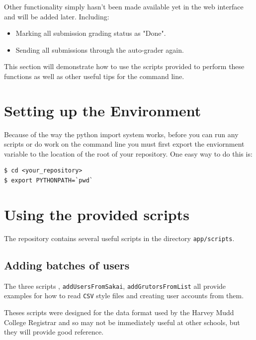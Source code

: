 \documentclass[11pt]{report}
\begin{document}
Other functionality simply hasn't been made available yet
in the web interface and will be added later. Including:
\begin{itemize}
  \item Marking all submission grading status as "Done".
  \item Sending all submissions through the auto-grader again.
\end{itemize}

This section will demonstrate how to use the scripts provided to perform these
functions as well as other useful tips for the command line.

\section{Setting up the Environment}
Because of the way the python import system works, before you can run any
scripts or do work on the command line you must first export the enviornment
variable  to the location of the root of your repository.
One easy way to do this is:
\begin{verbatim}
$ cd <your_repository>
$ export PYTHONPATH=`pwd`
\end{verbatim}

\section{Using the provided scripts}
The repository contains several useful scripts in the directory
\texttt{app/scripts}.

\subsection{Adding batches of users}
The three scripts , \texttt{addUsersFromSakai},
\texttt{addGrutorsFromList} all provide examples for how to read \texttt{CSV}
style files and creating user accounts from them.

Theses scripts were designed for the data format used by the Harvey Mudd
College Registrar and so may not be immediately useful at other schools, but
they will provide good reference.
\end{document}
